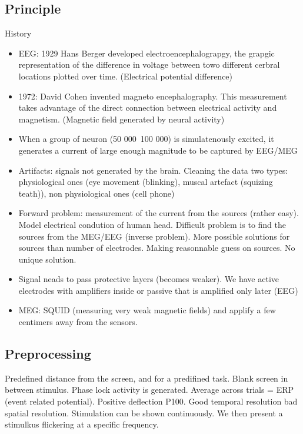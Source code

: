 \subsection{Principle}
History
\begin{itemize}
  \item EEG: 1929 Hans Berger developed electroencephalograpgy, the grapgic
    representation of the difference in voltage between towo different cerbral
    locations plotted over time. (Electrical potential difference)
    \item 1972: David Cohen invented magneto encephalography. This measurement
      takes advantage of the direct connection between electrical activity and
      magnetism. (Magnetic field generated by neural activity)

      \item When a group of neuron (50 000~100 000) is simulatenously excited, it generates a current
      of large enough magnitude to be captured by EEG/MEG
    \item Artifacts: signals not generated by the brain. Cleaning the data two types: physiological ones (eye movement (blinking), muscal artefact
      (squizing teath)), non physiological ones (cell phone) 
     \item Forward problem: measurement of the current from the sources (rather
       easy). Model electrical condution of human head.  Difficult problem is to
       find the sources from the MEG/EEG (inverse problem). More possible
       solutions for sources than number of electrodes.
       Making reasonnable guess on sources. No unique solution.

     \item Signal neads to pass protective layers (becomes weaker). We have
       active electrodes with amplifiers inside or passive that is amplified
       only later (EEG)
     \item MEG: SQUID (measuring very weak magnetic fields) and applify a few centimers away from the sensors.
      
\end{itemize}
\subsection{Preprocessing}
Predefined distance from the screen, and for a predifined task. Blank screen in
between stimulus. Phase lock activity  is generated. Average across trials = ERP
(event related potential). Positive deflection P100.
Good temporal resolution bad spatial resolution.
Stimulation can be shown continuously. We then present a stimulkus flickering at
a specific frequency.
